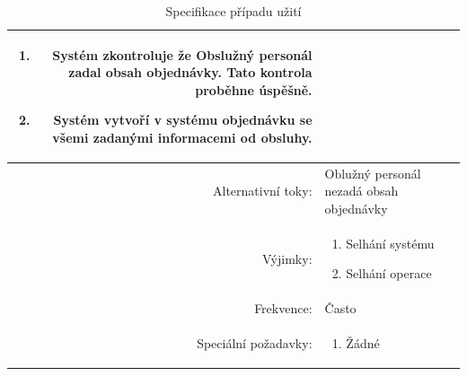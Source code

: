 \begin{table}[ht!]
{\begin{tabular}{| r | p{12cm} |}
\begin{minipage}[t]{0.75\textwidth}
\begin{enumerate}[nosep,after=\strut]
            \item Systém zkontroluje že Obslužný personál zadal obsah objednávky. Tato kontrola proběhne úspěšně.
            \item Systém vytvoří v systému objednávku se všemi zadanými informacemi od obsluhy.
    	\end{enumerate}
  	\end{minipage} \\
    \hline 
    Alternativní toky: & Oblužný personál nezadá obsah objednávky  \\
    \hline
    Výjimky: & 
    \begin{minipage}[t]{0.75\textwidth}
    	\begin{enumerate}[nosep,after=\strut] 
            \item Selhání systému
            \item Selhání operace
    	\end{enumerate}
  	\end{minipage} \\
    \hline
    Frekvence: & Často \\
    \hline
    Speciální požadavky: & 
    \begin{minipage}[t]{0.75\textwidth}
    	\begin{enumerate}[nosep,after=\strut]
    		\item Žádné
    	\end{enumerate}
  	\end{minipage} \\
    \hline

\end{tabular}}
\caption{Specifikace případu užití }
\label{table:1}
\end{table}

